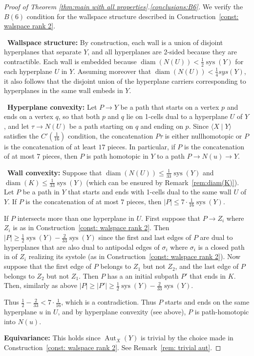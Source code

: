\documentclass[12pt,oneside]{amsart}
\theoremstyle{definition}
\theoremstyle{definition}
\theoremstyle{remark}
\DeclareMathOperator{\diam}{\text{diam}}
\DeclareMathOperator{\sys}{\mathrm sys}
\DeclareMathOperator{\Aut}{Aut}
\begin{document}
\begin{proof}[Proof of Theorem \ref{thm:main with all properties}.\eqref{conclusions:B6}]
We verify the  $B(6)$ condition for the wallspace structure described in Construction~\ref{const: walspace rank 2}.

\
 \textbf{Wallspace structure:} By construction, each wall is a union of disjoint hyperplanes that separate $Y$, and all hyperplanes  are 2-sided because they are contractible. Each wall is embedded because $\diam(N(U))< \frac{1}{2} \sys(Y)$ for each hyperplane $U$ in $Y$.  Assuming moreover that $\diam(N(U))< \frac{1}{4}sys(Y)$, it also follows that  the disjoint union of the hyperplane carriers corresponding to hyperplanes in the same wall embeds in $Y$.
 
 \
\textbf{Hyperplane convexity:} 
Let $P \rightarrow Y$ be a path that starts on a vertex $p$ and ends on a vertex $q$, so that both $p$ and $q$ lie
on 1-cells dual to a hyperplane $U$ of $Y$, and let $\tau \rightarrow N(U)$ be a path starting on $q$ and ending on $p$. Since $\langle X \mid Y\rangle$ satisfies the $C'(\frac{1}{16})$ condition, the concatenation $P\tau$ is either nullhomotopic or $P$ is the concatenation of at least $17$ pieces. In particular, if $P$ is the concatenation of at most 7 pieces, then $P$ is path homotopic
in $Y$ to a path $P\rightarrow N(u) \rightarrow Y$.

\    
\textbf{Wall convexity:} 
Suppose that $\diam(N(U))\leq \frac{1}{33}\sys(Y)$ and $\diam(K)\leq \frac{1}{33}\sys(Y)$ (which can be ensured by Remark~\ref{rem:diam(K)}). Let $P$ be a path in $Y$ that starts and ends with 1-cells dual to the same wall $U$ of $Y$. 
If $P$ is the concatenation of at most $7$ pieces, then $|P|\leq 7\cdot\frac{1}{16}\sys(Y)$.

If $P$ intersects more than one hyperplane in $U$. First suppose that $P\to Z_i$ where $Z_i$ is as in Construction~\ref{const: walspace rank 2}.
Then $|P|\geq \frac{1}{2}\sys(Y)- \frac{2}{33}\sys(Y)$ since the first and last edges of $P$ are dual to hyperplanes that are also dual to antipodal edges of $\sigma_i$ where $\sigma_i$ is a closed path in of $Z_i$ realizing its systole (as in Construction~\ref{const: walspace rank 2}).
Now suppose that the first edge of $P$ belongs to $Z_1$ but not $Z_2$, and the last edge of $P$ belongs to $Z_2$ but not $Z_1$. Then $P$ has a an initial subpath $P'$ that ends in $K$. Then, similarly as above $|P|\geq |P'|\geq \frac{1}{2}\sys(Y) - \frac{2}{33}\sys(Y)$.

Thus $\frac{1}{2}- \frac{2}{33} < 7\cdot\frac{1}{16}$, which is a contradiction. Thus $P$ starts and ends on the same hyperplane $u$ in $U$, and by hyperplane convexity (see above), $P$ is path-homotopic into $N(u)$.



\textbf{Equivariance:} This holds since $\Aut_X(Y)$ is trivial by the choice made in Construction~\ref{const: walspace rank 2}. See Remark~\ref{rem: trivial aut}. 
\end{proof}
\end{document}

